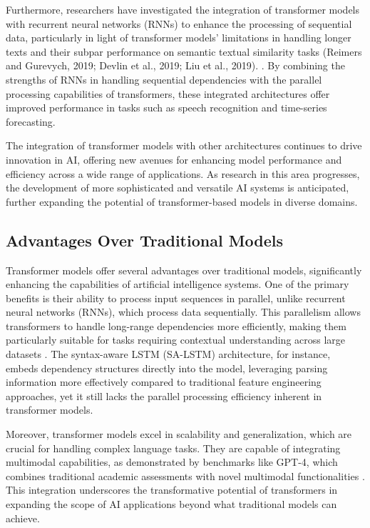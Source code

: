 Furthermore, researchers have investigated the integration of transformer models with recurrent neural networks (RNNs) to enhance the processing of sequential data, particularly in light of transformer models' limitations in handling longer texts and their subpar performance on semantic textual similarity tasks (Reimers and Gurevych, 2019; Devlin et al., 2019; Liu et al., 2019). \cite{ginzburg2021selfsuperviseddocumentsimilarityranking}. By combining the strengths of RNNs in handling sequential dependencies with the parallel processing capabilities of transformers, these integrated architectures offer improved performance in tasks such as speech recognition and time-series forecasting.



The integration of transformer models with other architectures continues to drive innovation in AI, offering new avenues for enhancing model performance and efficiency across a wide range of applications. As research in this area progresses, the development of more sophisticated and versatile AI systems is anticipated, further expanding the potential of transformer-based models in diverse domains.




\subsection{Advantages Over Traditional Models} \label{subsec:Advantages Over Traditional Models}

Transformer models offer several advantages over traditional models, significantly enhancing the capabilities of artificial intelligence systems. One of the primary benefits is their ability to process input sequences in parallel, unlike recurrent neural networks (RNNs), which process data sequentially. This parallelism allows transformers to handle long-range dependencies more efficiently, making them particularly suitable for tasks requiring contextual understanding across large datasets \cite{qian2017syntaxawarelstmmodel}. The syntax-aware LSTM (SA-LSTM) architecture, for instance, embeds dependency structures directly into the model, leveraging parsing information more effectively compared to traditional feature engineering approaches, yet it still lacks the parallel processing efficiency inherent in transformer models.

Moreover, transformer models excel in scalability and generalization, which are crucial for handling complex language tasks. They are capable of integrating multimodal capabilities, as demonstrated by benchmarks like GPT-4, which combines traditional academic assessments with novel multimodal functionalities \cite{GPT-4Techn0}. This integration underscores the transformative potential of transformers in expanding the scope of AI applications beyond what traditional models can achieve.

